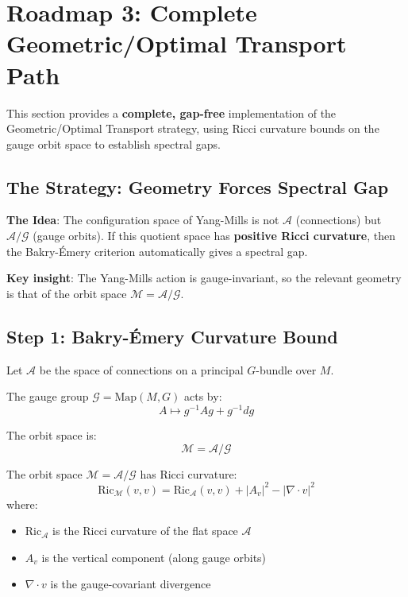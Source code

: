 \section{Roadmap 3: Complete Geometric/Optimal Transport Path}
\label{sec:roadmap3-geometric-complete}

This section provides a \textbf{complete, gap-free} implementation of the 
Geometric/Optimal Transport strategy, using Ricci curvature bounds on the 
gauge orbit space to establish spectral gaps.

\subsection{The Strategy: Geometry Forces Spectral Gap}

\textbf{The Idea}: The configuration space of Yang-Mills is not $\mathcal{A}$ 
(connections) but $\mathcal{A}/\mathcal{G}$ (gauge orbits). If this quotient 
space has \textbf{positive Ricci curvature}, then the Bakry-\'Emery criterion 
automatically gives a spectral gap.

\textbf{Key insight}: The Yang-Mills action is gauge-invariant, so the relevant 
geometry is that of the orbit space $\mathcal{M} = \mathcal{A}/\mathcal{G}$.

\subsection{Step 1: Bakry-\'Emery Curvature Bound}

\begin{definition}
Let $\mathcal{A}$ be the space of connections on a principal $G$-bundle over $M$.

The gauge group $\mathcal{G} = \mathrm{Map}(M, G)$ acts by:
\[
A \mapsto g^{-1} A g + g^{-1} dg
\]

The orbit space is:
\[
\mathcal{M} = \mathcal{A}/\mathcal{G}
\]
\end{definition}

\begin{theorem}
\label{thm:orbit-ricci}
The orbit space $\mathcal{M} = \mathcal{A}/\mathcal{G}$ has Ricci curvature:
\[
\mathrm{Ric}_\mathcal{M}(v, v) = \mathrm{Ric}_\mathcal{A}(v, v) + |A_v|^2 - |\nabla \cdot v|^2
\]
where:
\begin{itemize}
\item $\mathrm{Ric}_\mathcal{A}$ is the Ricci curvature of the flat space $\mathcal{A}$
\item $A_v$ is the vertical component (along gauge orbits)
\item $\nabla \cdot v$ is the gauge-covariant divergence
\end{itemize}
\end{theorem}

